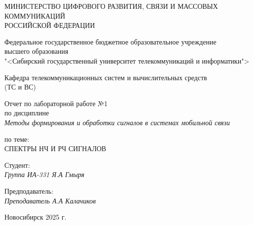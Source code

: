 \thispagestyle{empty}

\begin{center}
    МИНИСТЕРСТВО ЦИФРОВОГО РАЗВИТИЯ, СВЯЗИ И МАССОВЫХ КОММУНИКАЦИЙ \\ РОССИЙСКОЙ ФЕДЕРАЦИИ

    \vspace{20pt}

    Федеральное государственное бюджетное образовательное учреждение  \\  высшего образования \\
    "<Сибирский государственный университет телекоммуникаций и информатики"> \\

    \vspace{20pt}

    Кафедра телекоммуникационных систем и вычислительных средств \\  (ТС и ВС)
\end{center}

\vfill

\begin{center}
    Отчет по лабораторной работе №1 \\  
    по дисциплине \\
    \textit{Методы формирования и обработки сигналов в системах мобильной связи}

    \vspace{20pt}

    по теме: \\
    \uppercase{Спектры НЧ и РЧ сигналов}
\end{center}

\vfill

    \noindent Студент: \\
    \textit{Группа ИА-331 \hfill Я.А Гмыря}

    \vspace{20pt}

    \noindent Предподаватель: \\
    \textit{Преподаватель \hfill А.А Калачиков}

\vfill

\begin{center}
    Новосибирск 2025 г.
\end{center}